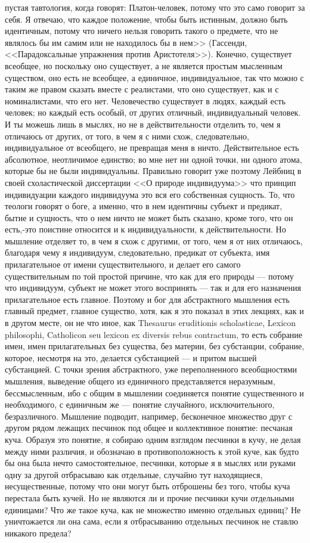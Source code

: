 \documentclass[12pt]{article}
\begin{document}
пустая тавтология, когда говорят: Платон-человек, потому что это само говорит за себя. Я отвечаю, что каждое положение, чтобы быть истинным, должно быть идентичным, потому что ничего нельзя говорить такого о предмете, что не являлось бы им самим или не находилось бы в нем>> (Гассенди, <<Парадоксальные упражнения против Аристотеля>>). Конечно, существует всеобщее, но поскольку оно существует, а не является простым мысленным существом, оно есть не всеобщее, а единичное, индивидуальное, так что можно с таким же правом сказать вместе с реалистами, что оно существует, как и с номиналистами, что его нет. Человечество существует в людях, каждый есть человек; но каждый есть особый, от других отличный, индивидуальный человек. И ты можешь лишь в мыслях, но не в действительности отделить то, чем я отличаюсь от других, от того, в чем я с ними схож, следовательно, индивидуальное от всеобщего, не превращая меня в ничто. Действительное есть абсолютное, неотличимое единство; во мне нет ни одной точки, ни одного атома, которые бы не были индивидуальны. Правильно говорит уже поэтому Лейбниц в своей схоластической диссертации <<О природе индивидуума>>  что принцип индивидуации каждого индивидуума это вся его собственная сущность. То, что теологи говорят о боге, а именно, что в нем идентичны субъект и предикат, бытие и сущность, что о нем ничто не может быть сказано, кроме того, что он есть,-это поистине относится и к индивидуальности, к действительности. Но мышление отделяет то, в чем я схож с другими, от того, чем я от них отличаюсь, благодаря чему я индивидуум, следовательно, предикат от субъекта, имя прилагательное от имени существительного, и делает его самого существительным по той простой причине, что как для его природы --- потому что индивидуум, субъект не может этого воспринять --- так и для его назначения прилагательное есть главное. Поэтому и бог для абстрактного мышления есть главный предмет, главное существо, хотя, как я это показал в этих лекциях, как и в другом месте, он не что иное, как Thesaurus eruditionis scholasticae, Lexicon philosophi, Catholicon seu lexicon ex diversis rebus contractum, то есть собрание имен, имен прилагательных без существа, без материи, без субстанции, собрание, которое, несмотря на это, делается субстанцией --- и притом высшей субстанцией. С точки зрения абстрактного, уже переполненного всеобщностями мышления, выведение общего из единичного представляется неразумным, бессмысленным, ибо с общим в мышлении соединяется понятие существенного и необходимого, с единичным же --- понятие случайного, исключительного, безразличного. Мышление подводит, например, бесконечное множество друг с другом рядом лежащих песчинок под общее и коллективное понятие: песчаная куча. Образуя это понятие, я собираю одним взглядом песчинки в кучу, не делая между ними различия, и обозначаю в противоположность к этой куче, как будто бы она была нечто самостоятельное, песчинки, которые я в мыслях или руками одну за другой отбрасываю как отдельные, случайно тут находящиеся, несущественные, потому что они могут быть отброшены без того, чтобы куча перестала быть кучей. Но не являются ли и прочие песчинки кучи отдельными единицами? Что же такое куча, как не множество именно отдельных единиц? Не уничтожается ли она сама, если я отбрасыванию отдельных песчинок не ставлю никакого предела? 
\end{document}
